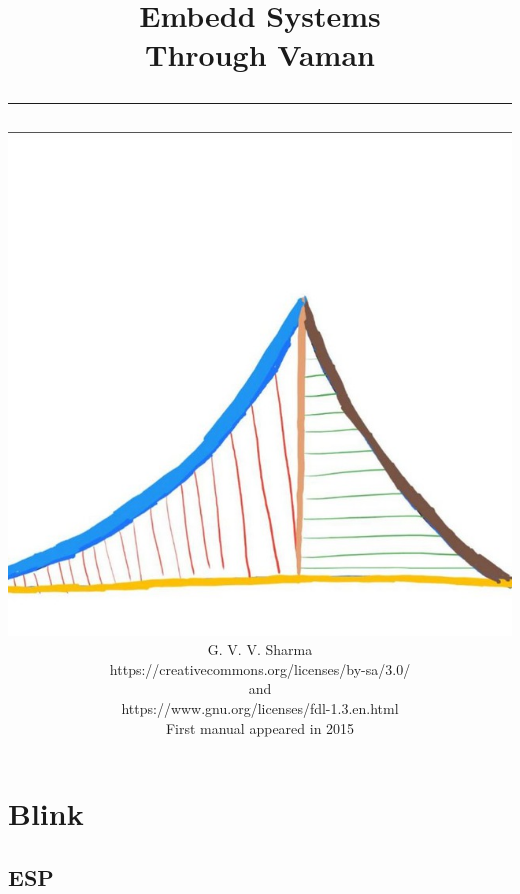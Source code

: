 \documentclass[journal]{IEEEtran}
\begin{document}

\onecolumn


\title{
	\begin{flushleft}
Embedd Systems\\ Through Vaman
	\\
\rule{0.4\columnwidth}{0.4pt}
\end{flushleft}
}
\author{
\vspace{7cm}
	\begin{flushleft}
\includegraphics[width=0.2\columnwidth]{figs/logo.jpg}
\\
		{	\huge G. V. V. Sharma}
		\\
\vspace{1cm}
https://creativecommons.org/licenses/by-sa/3.0/
\\
and
\\
https://www.gnu.org/licenses/fdl-1.3.en.html
\\
First manual appeared in 2015
	\end{flushleft}
}
\maketitle

\newpage


\tableofcontents

\newpage
\twocolumn

\section{Blink}
\subsection{ESP}

\end{document}
